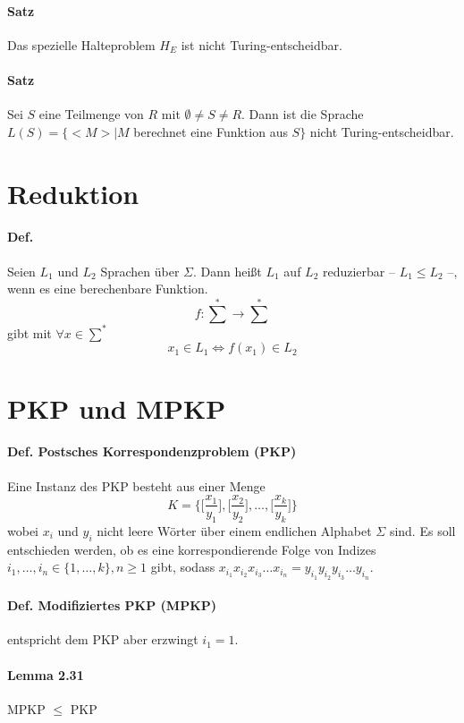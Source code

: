 \paragraph*{Satz} Das spezielle Halteproblem $H_E$ ist nicht Turing-entscheidbar.
\paragraph*{Satz} Sei $S$ eine Teilmenge von $R$ mit $\emptyset\not=S\not=R$. Dann ist die Sprache $L(S)=\{<M>|M$ berechnet eine Funktion aus $S\}$ nicht Turing-entscheidbar.


\section{Reduktion}
\paragraph*{Def.} Seien $L_1$ und $L_2$ Sprachen über $\Sigma$. Dann heißt $L_1$ auf $L_2$ reduzierbar -- $L_1 \leq L_2$ --, wenn es eine berechenbare Funktion. $$ f: \sum^* \rightarrow \sum^* $$ gibt mit $\forall x \in \sum^*$ $$ x_1 \in L_1 \Leftrightarrow f(x_1) \in L_2 $$


\section{PKP und MPKP}
\paragraph*{Def. Postsches Korrespondenzproblem (PKP)} Eine Instanz des PKP besteht aus einer Menge $$ K=\Bigg\{ \Bigg[\frac{x_1}{y_1}\Bigg], \Bigg[\frac{x_2}{y_2}\Bigg], \dots, \Bigg[\frac{x_k}{y_k}\Bigg] \Bigg\} $$ wobei $x_i$ und $y_i$ nicht leere Wörter über einem endlichen Alphabet $\Sigma$ sind. Es soll entschieden werden, ob es eine korrespondierende Folge von Indizes $i_1,\dots,i_n \in \{ 1,\dots,k \}, n \geq 1$ gibt, sodass $x_{i_1}x_{i_2}x_{i_3}\dots x_{i_n} = y_{i_1}y_{i_2}y_{i_3}\dots y_{i_n}$.
\paragraph*{Def. Modifiziertes PKP (MPKP)} entspricht dem PKP aber erzwingt $i_1 = 1$.

\paragraph*{Lemma 2.31} MPKP $\leq$ PKP
